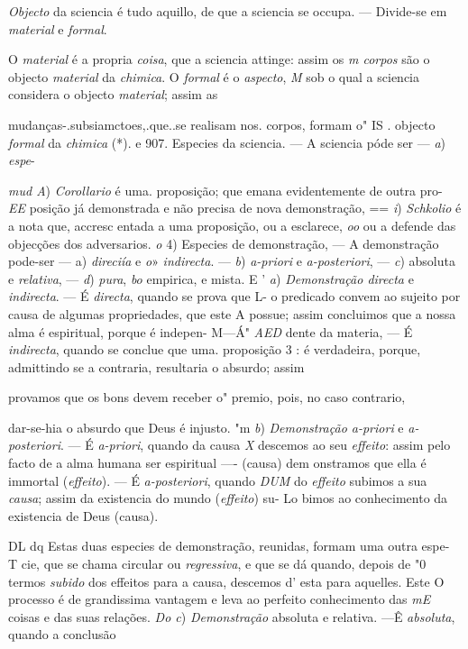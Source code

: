 
 
\emph{Objecto} da sciencia é tudo aquillo, de que a sciencia se occupa. --- Divide-se em \emph{material} e \emph{formal}.

O \emph{material} é a propria \emph{coisa}, que a sciencia attinge: assim os \emph{m corpos} são o objecto \emph{material} da \emph{chimica}. O \emph{formal} é o \emph{aspecto}, \emph{M} sob o qual a sciencia considera o objecto \emph{material}; assim as

mudanças-.subsiamctoes,.que..se realisam nos. corpos, formam o" IS . objecto \emph{formal} da \emph{chimica} (*). e 907. Especies da sciencia. --- A sciencia póde ser --- \emph{a}) \emph{espe}-

\emph{mud A}) \emph{Corollario} é uma. proposição; que emana evidentemente de outra pro- \emph{EE} posição já demonstrada e não precisa de nova demonstração, \textbar{} == \emph{i}) \emph{Schkolio} é a nota que, accresc entada a uma proposição, ou a esclarece, \emph{oo} ou a defende das objecções dos adversarios. \emph{o} 4) Especies de demonstração, --- A demonstração pode-ser --- a) \emph{direciía} e \emph{o}» \emph{indirecta}. --- \emph{b}) \emph{a-priori} e \emph{a-posteriori}, --- \emph{c}) absoluta e \emph{relativa}, --- \emph{d}) \emph{pura}, \emph{bo} empirica, e mista. E ' \emph{a}) \emph{Demonstração directa} e \emph{indirecta}. --- É \emph{directa}, quando se prova que L- o predicado convem ao sujeito por causa de algumas propriedades, que este A possue; assim concluimos que a nossa alma é espiritual, porque é indepen- M---Á" \emph{AED} dente da materia, --- É \emph{indirecta}, quando se conclue que uma. proposição 3 : é verdadeira, porque, admittindo se a contraria, resultaria o absurdo; assim

provamos que os bons devem receber o" premio, pois, no caso contrario,

dar-se-hia o absurdo que Deus é injusto. "m \emph{b}) \emph{Demonstração a-priori} e \emph{a-posteriori}. --- É \emph{a-priori}, quando da causa \emph{X} descemos ao seu \emph{effeito}: assim pelo facto de a alma humana ser espiritual ---- (causa) dem onstramos que ella é immortal (\emph{effeito}). --- É \emph{a-posteriori}, quando \emph{DUM} do \emph{effeito} subimos a sua \emph{causa}; assim da existencia do mundo (\emph{effeito}) su- Lo bimos ao conhecimento da existencia de Deus (causa).

DL dq Estas duas especies de demonstração, reunidas, formam uma outra espe- T cie, que se chama circular ou \emph{regressiva}, e que se dá quando, depois de "0 termos \emph{subido} dos effeitos para a causa, descemos d' esta para aquelles. Este O processo é de grandissima vantagem e leva ao perfeito conhecimento das \emph{mE} coisas e das suas relações. \emph{Do c}) \emph{Demonstração} absoluta e relativa. ---Ê \emph{absoluta}, quando a conclusão

